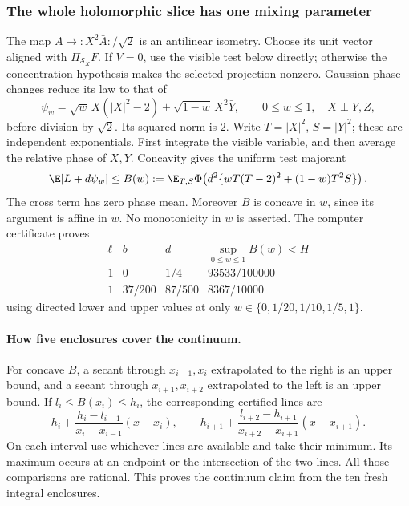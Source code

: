\subsubsection{The whole holomorphic slice has one mixing parameter}
The map $A\mapsto{:}X^2\bar A{:}/\sqrt2$ is an antilinear isometry.
Choose its unit vector aligned with $\Pi_{\mathcal S_X}F$.
If $V=0$, use the visible test below directly; otherwise the
concentration hypothesis makes the selected projection nonzero.
Gaussian phase changes reduce its law to that of
\[
 \psi_w=\sqrt w\,X(|X|^2-2)+\sqrt{1-w}\,X^2\bar Y,
 \qquad 0\le w\le1,\quad X\perp Y,Z,
\]
before division by $\sqrt2$. Its squared norm is $2$.
Write $T=|X|^2$, $S=|Y|^2$; these are independent exponentials.
First integrate the visible variable, and then average the relative
phase of $X,Y$. Concavity gives the uniform test majorant
\begin{equation}\label{eq:slice-concave-relaxation}
 \E|L+d\psi_w|\le B(w):=
 \E_{T,S}\Phi\!\left(d^2\{wT(T-2)^2+(1-w)T^2S\}\right).
\end{equation}
The cross term has zero phase mean. Moreover $B$ is concave in $w$,
since its argument is affine in $w$. No monotonicity in $w$ is asserted.
The computer certificate proves
\[
\begin{array}{c|c|c|c}
 \ell&b&d&\sup_{0\le w\le1}B(w)<H\\\hline
 1&0&1/4&93533/100000\\
 1&37/200&87/500&8367/10000
\end{array}
\]
using directed lower and upper values at only
$w\in\{0,1/20,1/10,1/5,1\}$.

\paragraph{How five enclosures cover the continuum.}
For concave $B$, a secant through $x_{i-1},x_i$ extrapolated to the
right is an upper bound, and a secant through $x_{i+1},x_{i+2}$
extrapolated to the left is an upper bound. If $l_i\le B(x_i)\le h_i$,
the corresponding certified lines are
\[
 h_i+\frac{h_i-l_{i-1}}{x_i-x_{i-1}}(x-x_i),\qquad
 h_{i+1}+\frac{l_{i+2}-h_{i+1}}{x_{i+2}-x_{i+1}}(x-x_{i+1}).
\]
On each interval use whichever lines are available and take their
minimum. Its maximum occurs at an endpoint or the intersection of the
two lines. All those comparisons are rational. This proves the
continuum claim from the ten fresh integral enclosures.

